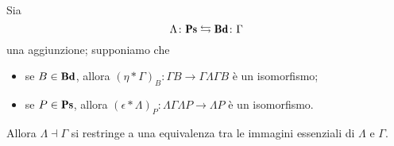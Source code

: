 \begin{MyExercise}
Sia 
\[
\Lambda \colon \cate{Ps}\leftrightarrows \cate{Bd} \colon \Gamma
\]
una aggiunzione; supponiamo che
\begin{itemize}
\item se $B\in \cate{Bd}$, allora $(\eta * \Gamma)_B\colon \Gamma B\to \Gamma\Lambda\Gamma B$ \`e un isomorfismo;
\item se $P\in \cate{Ps}$, allora $(\epsilon * \Lambda)_P\colon \Lambda\Gamma\Lambda P\to \Lambda P$ \`e un isomorfismo.
\end{itemize}
Allora $\Lambda\dashv \Gamma$ si restringe a una equivalenza tra le immagini essenziali di $\Lambda$ e  $\Gamma$.
\end{MyExercise}
